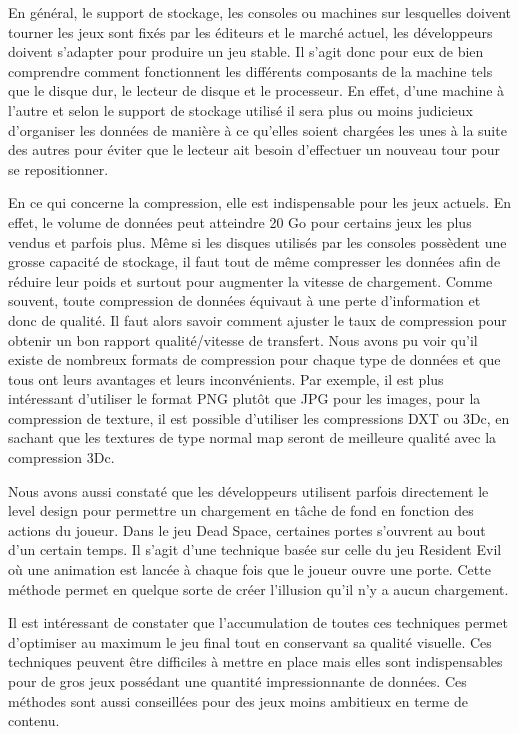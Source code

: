 \documentclass[a4paper, 12pt]{article} %
\begin{document}
En général, le support de stockage, les consoles ou machines sur lesquelles doivent tourner les jeux sont fixés par les éditeurs et le marché actuel, les développeurs doivent s'adapter pour produire un jeu stable. Il s'agit donc pour eux de bien comprendre comment fonctionnent les différents composants de la machine tels que le disque dur, le lecteur de disque et le processeur. En effet, d'une machine à l'autre et selon le support de stockage utilisé il sera plus ou moins judicieux d'organiser les données de manière à ce qu'elles soient chargées les unes à la suite des autres pour éviter que le lecteur ait besoin d'effectuer un nouveau tour pour se repositionner.

En ce qui concerne la compression, elle est indispensable pour les jeux actuels. En effet, le volume de données peut atteindre 20 Go pour certains jeux les plus vendus et parfois plus. Même si les disques utilisés par les consoles possèdent une grosse capacité de stockage, il faut tout de même compresser les données afin de réduire leur poids et surtout pour augmenter la vitesse de chargement. Comme souvent, toute compression de données équivaut à une perte d'information et donc de qualité. Il faut alors savoir comment ajuster le taux de compression pour obtenir un bon rapport qualité/vitesse de transfert. Nous avons pu voir qu'il existe de nombreux formats de compression pour chaque type de données et que tous ont leurs avantages et leurs inconvénients. Par exemple, il est plus intéressant d'utiliser le format PNG plutôt que JPG pour les images, pour la compression de texture, il est possible d'utiliser les compressions DXT ou 3Dc, en sachant que les textures de type normal map seront de meilleure qualité avec la compression 3Dc.

Nous avons aussi constaté que les développeurs utilisent parfois directement le level design pour permettre un chargement en tâche de fond en fonction des actions du joueur. Dans le jeu Dead Space, certaines portes s'ouvrent au bout d'un certain temps. Il s'agit d'une technique basée sur celle du jeu Resident Evil où une animation est lancée à chaque fois que le joueur ouvre une porte. Cette méthode permet en quelque sorte de créer l'illusion qu'il n'y a aucun chargement.

Il est intéressant de constater que l'accumulation de toutes ces techniques permet d'optimiser au maximum le jeu final tout en conservant sa qualité visuelle. Ces techniques peuvent être difficiles à mettre en place mais elles sont indispensables pour de gros jeux possédant une quantité impressionnante de données. Ces méthodes sont aussi conseillées pour des jeux moins ambitieux en terme de contenu.
\end{document}
